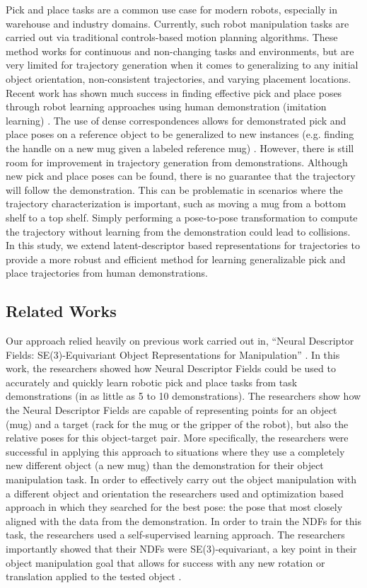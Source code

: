 \documentclass[10pt,twocolumn,letterpaper]{article}
\begin{document}
Pick and place tasks are a common use case for modern robots, especially in warehouse and industry domains. Currently, such robot manipulation tasks are carried out via traditional controls-based motion planning algorithms. These method works for continuous and non-changing tasks and environments, but are very limited for trajectory generation when it comes to generalizing to any initial object orientation, non-consistent trajectories, and varying placement locations. Recent work has shown much success in finding effective pick and place poses through robot learning approaches using human demonstration (imitation learning) \cite{simeonovdu2021ndf}. The use of dense correspondences allows for demonstrated pick and place poses on a reference object to be generalized to new instances (e.g. finding the handle on a new mug given a labeled reference mug) \cite{simeonovdu2021ndf}. However, there is still room for improvement in trajectory generation from demonstrations. Although new pick and place poses can be found, there is no guarantee that the trajectory will follow the demonstration. This can be problematic in scenarios where the trajectory characterization is important, such as moving a mug from a bottom shelf to a top shelf. Simply performing a pose-to-pose transformation to compute the trajectory without learning from the demonstration could lead to collisions. In this study, we extend latent-descriptor based representations for trajectories to provide a more robust and efficient method for learning generalizable pick and place trajectories from human demonstrations.

\subsection{Related Works}


Our approach relied heavily on previous work carried out in, “Neural Descriptor Fields: SE(3)-Equivariant Object Representations for Manipulation” \cite{simeonovdu2021ndf}. In this work, the researchers showed how Neural Descriptor Fields could be used to accurately and quickly learn robotic pick and place tasks from task demonstrations (in as little as 5 to 10 demonstrations). The researchers show how the Neural Descriptor Fields are capable of representing points for an object (mug) and a target (rack for the mug or the gripper of the robot), but also the relative poses for this object-target pair. More specifically, the researchers were successful in applying this approach to situations where they use a completely new different object (a new mug) than the demonstration for their object manipulation task. In order to effectively carry out the object manipulation with a different object and orientation the researchers used and optimization based approach in which they searched for the best pose: the pose that most closely aligned with the data from the demonstration. In order to train the NDFs for this task, the researchers used a self-supervised learning approach. The researchers importantly showed that their NDFs were SE(3)-equivariant, a key point in their object manipulation goal that allows for success with any new rotation or translation applied to the tested object \cite{simeonovdu2021ndf}.
\end{document}
